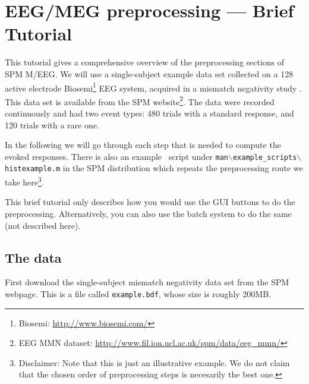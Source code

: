 \chapter{EEG/MEG preprocessing --- Brief Tutorial \label{ch:eeg:tutorial}}

This tutorial gives a comprehensive overview of the preprocessing sections of SPM M/EEG. We will use a single-subject example data set collected on a 128 active electrode Biosemi\footnote{Biosemi: \url{http://www.biosemi.com/}} EEG system, acquired in a mismatch negativity study \cite{mg_dcm_repro}. This data set is available from the SPM website\footnote{EEG MMN dataset: \url{http://www.fil.ion.ucl.ac.uk/spm/data/eeg\_mmn/}}. The data were recorded continuously and had two event types: 480 trials with a standard response, and 120 trials with a rare one.

In the following we will go through each step that is needed to compute the evoked responses. There is also an example \matlab\ script under \texttt{man$\backslash$example\_scripts$\backslash$histexample.m} in the SPM distribution which repeats the preprocessing route we take here\footnote{Disclaimer: Note that this is just an illustrative example. We do not claim that the chosen order of preprocessing steps is necesarily the best one.}.

This brief tutorial only describes how you would use the GUI buttons to do the preprocessing. Alternatively, you can also use the batch system to do the same (not described here).

\section{The data}
First download the single-subject mismatch negativity data set from the SPM webpage\footnotemark[2]. This is a file called \texttt{example.bdf}, whose size is roughly 200MB.

